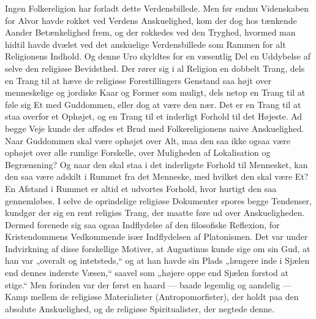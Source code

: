 \documentclass[12pt,a4paper]{article}
\newcommand{\opage}[1]{\marginnote{\footnotesize\textit{[#1]}}}
\begin{document}
Ingen Folkereligion har forladt dette Verdensbillede. Men før endnu
Videnskaben for Alvor havde rokket ved Verdens Anskuelighed, kom der dog
hos tænkende Aander Betænkelighed frem, og der rokkedes ved den Tryghed,
hvormed man hidtil havde dvælet ved det anskuelige Verdensbillede som
Rammen for alt Religionens Indhold. Og denne Uro skyldtes for en
væsentlig Del en Uddybelse af selve den religiøse Bevidsthed. Der rører
sig i al Religion en dobbelt Trang, dels en Trang til at hæve de religiøse
Forestillingers Genstand saa højt over menneskelige og jordiske Kaar og
Former som muligt, dels netop en Trang til at føle sig Et med Guddommen,
eller dog at være den nær. Det er en Trang til at staa overfor et Ophøjet,
og en Trang til et inderligt Forhold til det Højeste. Ad begge Veje kunde
der affødes et Brud med Folkereligionens naive Anskuelighed. Naar
Guddommen skal være ophøjet over Alt, maa den saa ikke ogsaa være ophøjet
over alle rumlige Forskelle, over Muligheden af Lokalisation og
Begrænsning? Og naar den skal staa i det inderligste Forhold til
Mennesket, kan den saa være adskilt i Rummet fra det Menneske, med hvilket
den skal være Et? En Afstand i Rummet er altid et udvortes Forhold, hvor
hurtigt den saa gennemløbes. I selve de oprindelige \opage{6} religiøse Dokumenter
spores begge Tendenser, kundgør der sig en rent religiøs Trang, der maatte
føre ud over Anskueligheden. Dermed forenede sig saa ogsaa Indflydelse af
den filosofiske Reflexion, for Kristendommens Vedkommende især
Indflydelsen af Platonismen. Det var under Indvirkning af disse
forskellige Motiver, at Augustinus kunde sige om sin Gud, at han var
„overalt og intetsteds,“ og at han havde sin Plads „længere inde i Sjælen
end dennes inderste Væsen,“ saavel som „højere oppe end Sjælen forstod at
stige.“ Men forinden var der først en haard --- baade legemlig og
aandelig --- Kamp mellem de religiøse Materialister (Antropomorfister),
der holdt paa den absolute Anskuelighed, og de religiøse Spiritualister,
der negtede denne.
\end{document}
